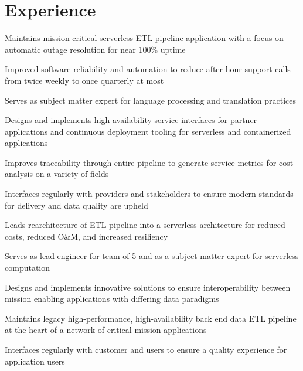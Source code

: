\documentclass[]{resume}
\begin{document}
\begin{minipage}[t]{0.69\textwidth}


\section{Experience}

\vspace{\topsep} %
\begin{tightemize}
\item Maintains mission-critical serverless ETL pipeline application with a focus on automatic outage resolution for near 100\% uptime
\item Improved software reliability and automation to reduce after-hour support calls from twice weekly to once quarterly at most
\item Serves as subject matter expert for language processing and translation practices
\item Designs and implements high-availability service interfaces for partner applications and continuous deployment tooling for serverless and containerized applications
\item Improves traceability through entire pipeline to generate service metrics for cost analysis on a variety of fields
\item Interfaces regularly with providers and stakeholders to ensure modern standards for delivery and data quality are upheld
\end{tightemize}

\sectionsep

\begin{tightemize}
\item Leads rearchitecture of ETL pipeline into a serverless architecture for reduced costs, reduced O\&M, and increased resiliency
\item Serves as lead engineer for team of 5 and as a subject matter expert for serverless computation
\item Designs and implements innovative solutions to ensure interoperability between mission enabling applications with differing data paradigms
\item Maintains legacy high-performance, high-availability back end data ETL pipeline at the heart of a network of critical mission applications
\item Interfaces regularly with customer and users to ensure a quality experience for application users
\end{tightemize}


\end{minipage}
\end{document}
